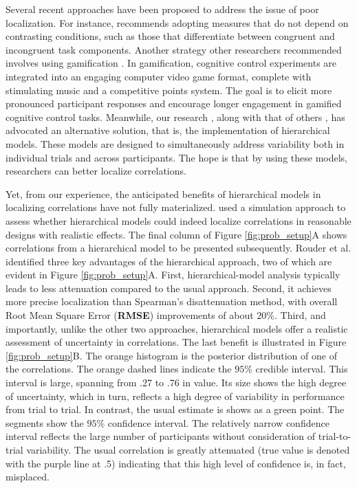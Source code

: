 \documentclass[man, 12pt]{apa7} %
\begin{document}
Several recent approaches have been proposed to address the issue of poor localization. For instance, \textcite{Draheim.etal.2019} recommends adopting measures that do not depend on contrasting conditions, such as those that differentiate between congruent and incongruent task components. Another strategy other researchers recommended involves using gamification \parencite[]{Deveau.etal.2015, Kucina.etal.2023, Wells.etal.2021}. In gamification, cognitive control experiments are integrated into an engaging computer video game format, complete with stimulating music and a competitive points system. The goal is to elicit more pronounced participant responses and encourage longer engagement in gamified cognitive control tasks.
Meanwhile, our research \parencite[]{Rouder.Haaf.2019}, along with that of others \parencite{Haines.etal.2023, Matzke.etal.2017}, has advocated an alternative solution, that is, the implementation of hierarchical models. These models are designed to simultaneously address variability both in individual trials and across participants.  The hope is that by using these models, researchers can better localize correlations.

Yet, from our experience, the anticipated benefits of hierarchical models in localizing correlations have not fully materialized. \textcite{Rouder.etal.2023} used a simulation approach to assess whether hierarchical models could indeed localize correlations in reasonable designs with realistic effects. The final column of Figure \ref{fig:prob_setup}A shows correlations from a hierarchical model to be presented subsequently. Rouder et al. identified three key advantages of the hierarchical approach, two of which are evident in Figure \ref{fig:prob_setup}A.  First, hierarchical-model analysis typically leads to less attenuation compared to the usual approach. Second, it achieves more precise localization than Spearman's disattenuation method, with overall Root Mean Square Error (\textbf{RMSE}) improvements of about $20\%$. Third, and importantly, unlike the other two approaches, hierarchical models offer a realistic assessment of uncertainty in correlations. The last benefit is illustrated in Figure \ref{fig:prob_setup}B. The orange histogram is the posterior distribution of one of the correlations. The orange dashed lines indicate the $95\%$ credible interval.  This interval is large, spanning from .27 to .76 in value.  Its size shows the high degree of uncertainty, which in turn, reflects a high degree of variability in performance from trial to trial.  In contrast, the usual estimate is shows as a green point.  The segments show the  $95\%$ confidence interval.  The relatively narrow confidence interval reflects the large number of participants without consideration of trial-to-trial variability. The usual correlation is greatly attenuated (true value is denoted with the purple line at .5) indicating that this high level of confidence is, in fact, misplaced. 
\end{document}
